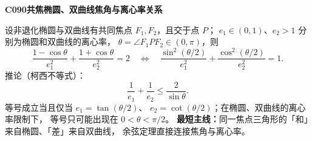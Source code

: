 \textbf{C090\quad 共焦椭圆、双曲线焦角与离心率关系}

设非退化椭圆与双曲线有共同焦点 $F_1,F_2$，且交于点 $P$；
$e_1\in(0,1)$、$e_2>1$ 分别为椭圆和双曲线的离心率，
$\theta=\angle F_1PF_2\in(0,\pi)$，则
\[
\boxed{\frac{1-\cos\theta}{e_1^2}
+\frac{1+\cos\theta}{e_2^2}=2}
\quad\Longleftrightarrow\quad
\boxed{\frac{\sin^2(\theta/2)}{e_1^2}
+\frac{\cos^2(\theta/2)}{e_2^2}=1}.
\]
推论（柯西不等式）：
\[
\boxed{\frac1{e_1}+\frac1{e_2}\le\frac2{\sin\theta}}.
\]
等号成立当且仅当 $e_1=\tan(\theta/2)$、
$e_2=\cot(\theta/2)$；在椭圆、双曲线的离心率限制下，
等号只可能出现在 $0<\theta<\pi/2$。
\textbf{最短主线：}同一焦点三角形的「和」来自椭圆、「差」来自双曲线，
余弦定理直接连接焦角与离心率。
